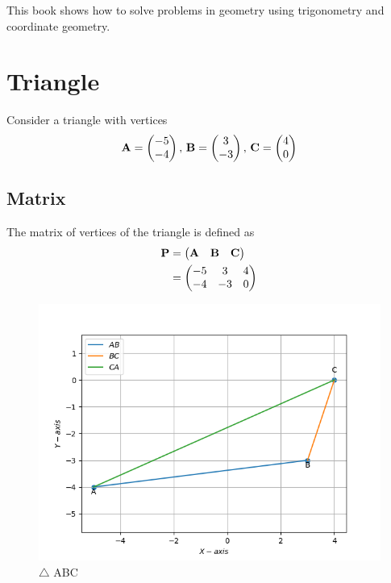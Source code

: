 \documentclass[10pt]{book}
\begin{document}
\frontmatter
\subtitle{Through Algebra}
\titlepage
\tableofcontents
\setcounter{page}{0}
\begin{introduction}
This book shows how to solve problems in geometry using trigonometry and coordinate geometry. 
\end{introduction}
\mainmatter
\chapter{Triangle}
Consider a triangle with vertices
		\begin{align}
			\label{eq:tri-pts}
			\vec{A} = \myvec{-5 \\ -4},\,
			\vec{B} = \myvec{3 \\ -3},\,
			\vec{C} = \myvec{4 \\ 0}
		\end{align}
\section{Matrix}
The matrix of vertices of the triangle is defined as
		\begin{align}
			\mathbf{P} &= \begin{pmatrix}\mathbf{A} & \mathbf{B} &\mathbf{C}\end{pmatrix} \\
            &=\begin{pmatrix}-5 & 3 & 4 \\ -4 & -3 & 0\end{pmatrix}
		\end{align}
\begin{figure}[H]
    \centering
    \includegraphics{figs/ABC_plot.png}
    \caption{$\triangle$ ABC}
    \label{fig:ABC_plot}
\end{figure}
\end{document}

